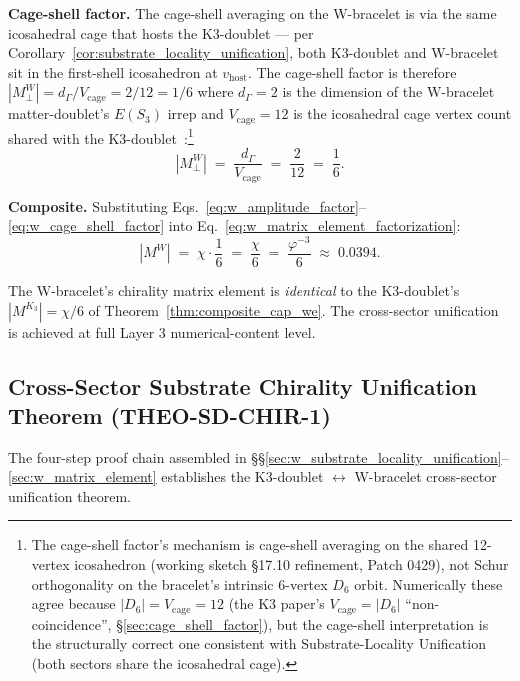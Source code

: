 \documentclass[11pt,letterpaper]{article}
\newcommand{\phig}{\varphi}
\newcommand{\Kthree}{\ensuremath{K_3}}
\newcommand{\Dsix}{D_6}
\newcommand{\Sthree}{S_3}
\begin{document}
\textbf{Cage-shell factor.} The cage-shell averaging on the W-bracelet is via the same icosahedral cage that hosts the K3-doublet --- per Corollary~\ref{cor:substrate_locality_unification}, both K3-doublet and W-bracelet sit in the first-shell icosahedron at $v_{\text{host}}$. The cage-shell factor is therefore $|M_\perp^W| = d_\Gamma / V_{\text{cage}} = 2/12 = 1/6$ where $d_\Gamma = 2$ is the dimension of the W-bracelet matter-doublet's $E(\Sthree)$ irrep and $V_{\text{cage}} = 12$ is the icosahedral cage vertex count shared with the K3-doublet~\cite{abshier_capotauro_chiral_mechanism_sketch}:\footnote{The cage-shell factor's mechanism is cage-shell averaging on the shared 12-vertex icosahedron (working sketch \S17.10 refinement, Patch 0429), not Schur orthogonality on the bracelet's intrinsic 6-vertex $\Dsix$ orbit. Numerically these agree because $|\Dsix| = V_{\text{cage}} = 12$ (the K3 paper's $V_{\text{cage}} = |\Dsix|$ ``non-coincidence'', \S\ref{sec:cage_shell_factor}), but the cage-shell interpretation is the structurally correct one consistent with Substrate-Locality Unification (both sectors share the icosahedral cage).}
\begin{equation}\label{eq:w_cage_shell_factor}
|M_\perp^W| \;=\; \frac{d_\Gamma}{V_{\text{cage}}} \;=\; \frac{2}{12} \;=\; \frac{1}{6}.
\end{equation}

\textbf{Composite.} Substituting Eqs.~\eqref{eq:w_amplitude_factor}--\eqref{eq:w_cage_shell_factor} into Eq.~\eqref{eq:w_matrix_element_factorization}:
\begin{equation}\label{eq:w_composite_result}
|M^W| \;=\; \chi \cdot \frac{1}{6} \;=\; \frac{\chi}{6} \;=\; \frac{\phig^{-3}}{6} \;\approx\; 0.0394.
\end{equation}

The W-bracelet's chirality matrix element is \emph{identical} to the K3-doublet's $|M^{\Kthree}| = \chi/6$ of Theorem~\ref{thm:composite_cap_we}. The cross-sector unification is achieved at full Layer 3 numerical-content level.

\subsection{Cross-Sector Substrate Chirality Unification Theorem (THEO-SD-CHIR-1)}\label{sec:theo_sd_chir_1_statement}

The four-step proof chain assembled in \S\S\ref{sec:w_substrate_locality_unification}--\ref{sec:w_matrix_element} establishes the K3-doublet $\leftrightarrow$ W-bracelet cross-sector unification theorem.
\end{document}
